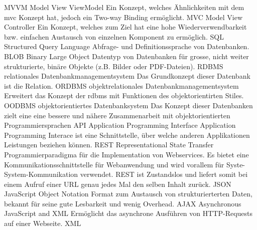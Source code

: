   {MVVM}               %
  {Model View ViewModel}  %
  {Ein Konzept, welches Ähnlichkeiten mit dem \gls{mvc} Konzept hat, jedoch ein Two-way Binding ermöglicht.}
  {MVC}               %
  {Model View Controller}  %
  {Ein Konzept, welches zum Ziel hat eine hohe Wiederverwendbarkeit bzw. einfachen Austausch von einzelnen Komponent zu ermöglich.}  
  {SQL}               %
  {Structured Query Language}  %
  {Abfrage- und Definitionssprache von Datenbanken.}
  {BLOB}               %
  {Binary Large Object}  %
  {Datentyp von Datenbanken für grosse, nicht weiter strukturierte, binäre Objekte (z.B. Bilder oder PDF-Dateien).}
  {RDBMS}               %
  {relationales Datenbankmanagementsystem}  %
  {Das Grundkonzept dieser Datenbank ist die Relation.}
  {ORDBMS}               %
  {objektrelationales Datenbankmanagementsystem}  %
  {Erweitert das Konzept der \gls{rdbms} mit Funktionen des objektorientirten Stiles.}
  {OODBMS}               %
  {objektorientiertes Datenbanksystem}  %
  {Das Konzept dieser Datenbanken zielt eine eine bessere und nähere Zusammenarbeit mit objektorientierten Programmiersprachen}
  {API}               %
  {Application Programming Interface}
  {Application Programming Interace ist eine Schnittstelle, über welche anderen Applikationen Leistungen beziehen können.}
  {REST}               %
  {Representational State Transfer}
  {Programmierparadigma für die Implementation von Webservices. Es bietet eine Kommunikationsschnittstelle für Webanwendung und 
wird vorallem für Syste-System-Kommunikation verwendet. REST ist Zustandslos und liefert somit bei einem Aufruf einer URL genau 
jedes Mal den selben Inhalt zurück.}
  {JSON}               %
  {JavaScript Object Notation}  %
  {Format zum Austausch von strukturierterten Daten, bekannt für seine gute Lesbarkeit und wenig Overhead.}
  {AJAX}               %
  {Asynchronous JavaScript and XML}  %
  {Ermöglicht das asynchrone Ausführen von HTTP-Requests auf einer Webseite.}
  {XML}               %
